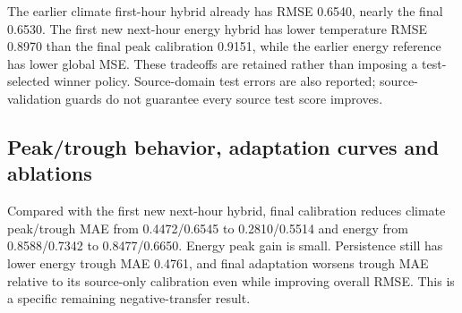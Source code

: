 The earlier climate first-hour hybrid already has RMSE 0.6540, nearly the final 0.6530. The first new next-hour energy hybrid has lower temperature RMSE 0.8970 than the final peak calibration 0.9151, while the earlier energy reference has lower global MSE. These tradeoffs are retained rather than imposing a test-selected winner policy. Source-domain test errors are also reported; source-validation guards do not guarantee every source test score improves.
\FloatBarrier

\subsection{Peak/trough behavior, adaptation curves and ablations}

Compared with the first new next-hour hybrid, final calibration reduces climate peak/trough MAE from 0.4472/0.6545 to 0.2810/0.5514 and energy from 0.8588/0.7342 to 0.8477/0.6650. Energy peak gain is small. Persistence still has lower energy trough MAE 0.4761, and final adaptation worsens trough MAE relative to its source-only calibration even while improving overall RMSE. This is a specific remaining negative-transfer result.

